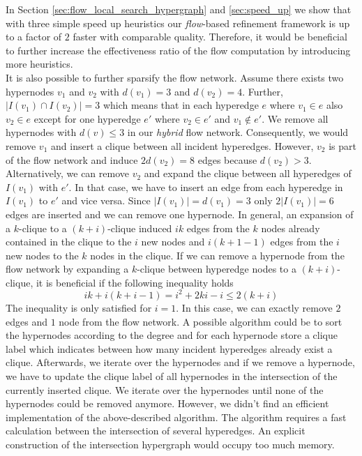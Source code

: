 In Section \ref{sec:flow_local_search_hypergraph} and \ref{sec:speed_up} we show that with
three simple speed up heuristics our \emph{flow}-based refinement framework is up to a factor
of $2$ faster with comparable quality. Therefore, it would be beneficial to further increase
the effectiveness ratio of the flow computation by introducing more heuristics. \\
It is also possible to further sparsify the flow network. Assume there exists two hypernodes
$v_1$ and $v_2$ with $d(v_1) = 3$ and $d(v_2) = 4$. Further, $|I(v_1) \cap I(v_2)| = 3$ which means
that in each hyperedge $e$ where $v_1 \in e$ also $v_2 \in e$ except for one hyperedge $e'$
where $v_2 \in e'$ and $v_1 \notin e'$. We remove all hypernodes with $d(v) \le 3$ in our
\emph{hybrid} flow network. Consequently, we would remove $v_1$ and insert a clique between all incident
hyperedges. However, $v_2$ is part of the flow network and induce $2d(v_2) = 8$ edges because $d(v_2) > 3$.
Alternatively, we can remove $v_2$ and expand the clique between all hyperedges of $I(v_1)$
with $e'$. In that case, we have to insert an edge from each hyperedge in $I(v_1)$ to $e'$ and vice
versa. Since $|I(v_1)| = d(v_1) = 3$ only $2|I(v_1)| = 6$ edges are inserted and we can remove
one hypernode. In general, an expansion of a $k$-clique to a $(k+i)$-clique induced 
$ik$ edges from the $k$ nodes already contained in the clique to the $i$ new nodes and
$i(k+1-1)$ edges from the $i$ new nodes to the $k$ nodes in the clique. If we can remove a 
hypernode from the flow network by expanding a $k$-clique between hyperedge nodes to a $(k+i)$-clique,
it is beneficial if the following inequality holds 
\[ik + i(k+i-1) = i^2 + 2ki - i \le 2(k+i)\]
The inequality is only satisfied for $i = 1$. In this case, we can exactly remove $2$ edges and
$1$ node from the flow network. A possible algorithm could be to sort the hypernodes according
to the degree and for each hypernode store a clique label which indicates between how many
incident hyperedges already exist a clique. Afterwards, we iterate over the hypernodes and if we remove
a hypernode, we have to update the clique label of all hypernodes in the intersection of the
currently inserted clique. We iterate over the hypernodes until none of the hypernodes could
be removed anymore. However, we didn't find an efficient implementation of the above-described
algorithm. The algorithm requires a fast calculation between the intersection of several
hyperedges. An explicit construction of the intersection hypergraph would occupy too much
memory. 
